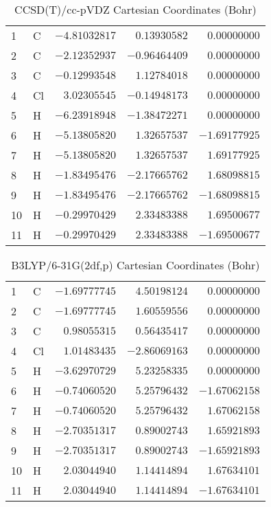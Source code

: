 \documentclass[10pt,oneside]{article}
\begin{document}
\begin{table}[h!]
\centering
\caption{CCSD(T)/cc-pVDZ Cartesian Coordinates (Bohr)}
\begin{tabular}{llrrr}
1  & C  & $-4.81032817$ & $ 0.13930582$ & $ 0.00000000$ \\
2  & C  & $-2.12352937$ & $-0.96464409$ & $ 0.00000000$ \\
3  & C  & $-0.12993548$ & $ 1.12784018$ & $ 0.00000000$ \\
4  & Cl & $ 3.02305545$ & $-0.14948173$ & $ 0.00000000$ \\
5  & H  & $-6.23918948$ & $-1.38472271$ & $ 0.00000000$ \\
6  & H  & $-5.13805820$ & $ 1.32657537$ & $-1.69177925$ \\
7  & H  & $-5.13805820$ & $ 1.32657537$ & $ 1.69177925$ \\
8  & H  & $-1.83495476$ & $-2.17665762$ & $ 1.68098815$ \\
9  & H  & $-1.83495476$ & $-2.17665762$ & $-1.68098815$ \\
10 & H  & $-0.29970429$ & $ 2.33483388$ & $ 1.69500677$ \\
11 & H  & $-0.29970429$ & $ 2.33483388$ & $-1.69500677$ \\
\end{tabular}
\end{table}

\begin{table}[h!]
\centering
\caption{B3LYP/6-31G(2df,p) Cartesian Coordinates (Bohr)}
\begin{tabular}{llrrr}
1  & C  & $-1.69777745$ & $ 4.50198124$ & $ 0.00000000$ \\
2  & C  & $-1.69777745$ & $ 1.60559556$ & $ 0.00000000$ \\
3  & C  & $ 0.98055315$ & $ 0.56435417$ & $ 0.00000000$ \\
4  & Cl & $ 1.01483435$ & $-2.86069163$ & $ 0.00000000$ \\
5  & H  & $-3.62970729$ & $ 5.23258335$ & $ 0.00000000$ \\
6  & H  & $-0.74060520$ & $ 5.25796432$ & $-1.67062158$ \\
7  & H  & $-0.74060520$ & $ 5.25796432$ & $ 1.67062158$ \\
8  & H  & $-2.70351317$ & $ 0.89002743$ & $ 1.65921893$ \\
9  & H  & $-2.70351317$ & $ 0.89002743$ & $-1.65921893$ \\
10 & H  & $ 2.03044940$ & $ 1.14414894$ & $ 1.67634101$ \\
11 & H  & $ 2.03044940$ & $ 1.14414894$ & $-1.67634101$ \\
\end{tabular}
\end{table}
\end{document}
